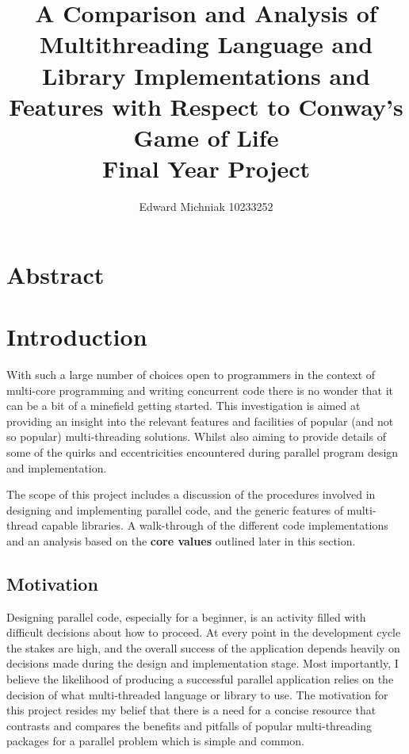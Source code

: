 \documentclass[11pt]{article} %
\title{A Comparison and Analysis of Multithreading Language and Library Implementations and Features with Respect to Conway's Game of Life\\Final Year Project}
\author{Edward Michniak 10233252}
\date{} %
\begin{document}
\maketitle
\pagebreak
\tableofcontents
\section{Abstract}
\section{Introduction}
With such a large number of choices open to programmers in the context of multi-core programming and writing concurrent code there is no wonder that it can be a bit of a minefield getting started. This investigation is aimed at providing an insight into the relevant features and facilities of popular (and not so popular) multi-threading solutions. Whilst also aiming to provide details of some of the quirks and eccentricities encountered during parallel program design and implementation.

The scope of this project includes a discussion of the procedures involved in designing and implementing parallel code, and the generic features of multi-thread capable libraries. A walk-through of the different code implementations and an analysis based on the {\bf core values} outlined later in this section.
\subsection{Motivation}
Designing parallel code, especially for a beginner, is an activity filled with difficult decisions about how to proceed. At every point in the development cycle the stakes are high, and the overall success of the application depends heavily on decisions made during the design and implementation stage. Most importantly, I believe the likelihood of producing a successful parallel application relies on the decision of what multi-threaded language or library to use. The motivation for this project resides my belief that there is a need for a concise resource that contrasts and compares the benefits and pitfalls of popular multi-threading packages for a parallel problem which is simple and common.
\end{document}
